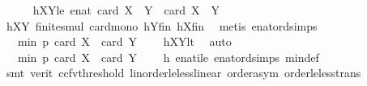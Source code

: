 \begin{isabellebody}
\ \ \ \ \isamarkupfalse%
\ hXY{}le{\isacharcolon}{\kern0pt}\ {\isachardoublequoteopen}enat\ {\isacharparenleft}{\kern0pt}card\ {\isacharparenleft}{\kern0pt}{\isacharquery}{\kern0pt}X{}\ {\isasymcdots}\ {\isacharquery}{\kern0pt}Y{}{\isacharparenright}{\kern0pt}{\isacharparenright}{\kern0pt}\ {\isasymle}\ card\ {\isacharparenleft}{\kern0pt}X\ {\isasymcdots}\ Y{\isacharparenright}{\kern0pt}{\isachardoublequoteclose}\ \isanewline
\ \ \ \ \ \ \isamarkupfalse%
\ hXY{}\ finite{\isacharunderscore}{\kern0pt}smul\ card{\isacharunderscore}{\kern0pt}mono\ hYfin\ hXfin\ \isamarkupfalse%
\ {\isacharparenleft}{\kern0pt}metis\ enat{\isacharunderscore}{\kern0pt}ord{\isacharunderscore}{\kern0pt}simps{\isacharparenleft}{\kern0pt}{}{\isacharparenright}{\kern0pt}{\isacharparenright}{\kern0pt}\isanewline
\ \ \ \ \isamarkupfalse%
\ \isamarkupfalse%
\ {\isachardoublequoteopen}{\isachardot}{\kern0pt}{\isachardot}{\kern0pt}{\isachardot}{\kern0pt}\ {\isacharless}{\kern0pt}\ min\ p\ {\isacharparenleft}{\kern0pt}card\ X\ {\isacharplus}{\kern0pt}\ card\ Y\ {\isacharminus}{\kern0pt}\ {}{\isacharparenright}{\kern0pt}{\isachardoublequoteclose}\ \isamarkupfalse%
\ hXYlt\ \isamarkupfalse%
\ auto\isanewline
\ \ \ \ \isamarkupfalse%
\ \isamarkupfalse%
\ {\isachardoublequoteopen}{\isachardot}{\kern0pt}{\isachardot}{\kern0pt}{\isachardot}{\kern0pt}\ {\isasymle}\ min\ p\ {\isacharparenleft}{\kern0pt}card\ {\isacharquery}{\kern0pt}X{}\ {\isacharplus}{\kern0pt}\ card\ {\isacharquery}{\kern0pt}Y{}\ {\isacharminus}{\kern0pt}\ {}{\isacharparenright}{\kern0pt}{\isachardoublequoteclose}\ \isamarkupfalse%
\ h\ enat{\isacharunderscore}{\kern0pt}ile\ enat{\isacharunderscore}{\kern0pt}ord{\isacharunderscore}{\kern0pt}simps{\isacharparenleft}{\kern0pt}{}{\isacharparenright}{\kern0pt}\ min{\isacharunderscore}{\kern0pt}def\isanewline
\ \ \ \ \ \ \isamarkupfalse%
\ {\isacharparenleft}{\kern0pt}smt\ {\isacharparenleft}{\kern0pt}verit{\isacharcomma}{\kern0pt}\ ccfv{\isacharunderscore}{\kern0pt}threshold{\isacharparenright}{\kern0pt}\ linorder{\isacharunderscore}{\kern0pt}le{\isacharunderscore}{\kern0pt}less{\isacharunderscore}{\kern0pt}linear\ order{\isachardot}{\kern0pt}asym\ order{\isacharunderscore}{\kern0pt}le{\isacharunderscore}{\kern0pt}less{\isacharunderscore}{\kern0pt}trans{\isacharparenright}{\kern0pt}\isanewline

\end{isabellebody}
